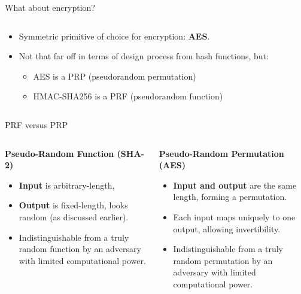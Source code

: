 \documentclass[aspectratio=169, lualatex, handout]{beamer}
\begin{document}
\begin{frame}{What about encryption?}
	\begin{columns}[c]
		\begin{column}{0.6\textwidth}
			\begin{itemize}[<+->]
				\item Symmetric primitive of choice for encryption: \textbf{AES}.
				\item Not that far off in terms of design process from hash functions,
				      but:
				      \begin{itemize}[<+->]
					      \item AES is a PRP (pseudorandom permutation)
					      \item HMAC-SHA256 is a PRF (pseudorandom function)
				      \end{itemize}
			\end{itemize}
		\end{column}

		\begin{column}{0.4\textwidth}
		\end{column}
	\end{columns}
\end{frame}

\begin{frame}{PRF versus PRP}
	\begin{columns}[c]
		\begin{column}{0.5\textwidth}
			\textbf{Pseudo-Random Function (SHA-2)}
			\begin{itemize}[<+->]
				\item \textbf{Input} is arbitrary-length,
				\item \textbf{Output} is fixed-length, looks random (as discussed
				      earlier).
				\item Indistinguishable from a truly random function by an adversary with
				      limited computational power.
			\end{itemize}
		\end{column}

		\begin{column}{0.5\textwidth}
			\textbf{Pseudo-Random Permutation (AES)}
			\begin{itemize}[<+->]
				\item \textbf{Input and output} are the same length, forming a permutation.
				\item Each input maps uniquely to one output, allowing invertibility.
				\item Indistinguishable from a truly random permutation by an adversary
				      with limited computational power.
			\end{itemize}
		\end{column}
	\end{columns}
\end{frame}
\end{document}
